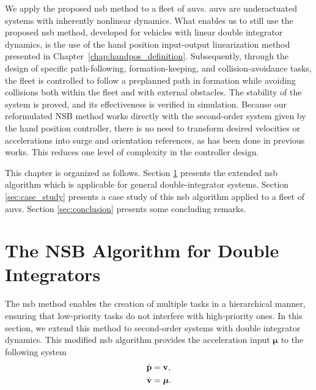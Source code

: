We apply the proposed \gls{nsb} method to a fleet of \glspl{auv}. \Glspl{auv} are underactuated systems with inherently nonlinear dynamics. What enables us to still use the proposed \gls{nsb} method, developed for vehicles with linear double integrator dynamics, is the use of the hand position input-output linearization method presented in Chapter~\ref{chap:handpos_definition}. Subsequently, through the design of specific path-following, formation-keeping, and collision-avoidance tasks, the fleet is controlled to follow a preplanned path in formation while avoiding collisions both within the fleet and with external obstacles. The stability of the system is proved, and its effectiveness is verified in simulation. Because our reformulated NSB method works directly with the second-order system given by the hand position controller, there is no need to transform desired velocities or accelerations into surge and orientation references, as has been done in previous works. This reduces one level of complexity in the controller design.

This chapter is organized as follows. Section \ref{sec:NSB} presents the extended \gls{nsb} algorithm which is applicable for general double-integrator systems. Section \ref{sec:case_study} presents a case study of this \gls{nsb} algorithm applied to a fleet of \glspl{auv}. Section \ref{sec:conclusion} presents some concluding remarks.

\section{The NSB Algorithm for Double Integrators}\label{sec:NSB}
The \gls{nsb} method enables the creation of multiple tasks in a hierarchical manner, ensuring that low-priority tasks do not interfere with high-priority ones. In this section, we extend this method to second-order systems with double integrator dynamics.
This modified \gls{nsb} algorithm provides the acceleration input $\bm{\mu}$ to the following system
\begin{subequations}
    \begin{align}
        \dot{\mathbf{p}} &= \mathbf{v}, \\
        \dot{\mathbf{v}} &= \bm{\mu}.
    \end{align}
\end{subequations}

